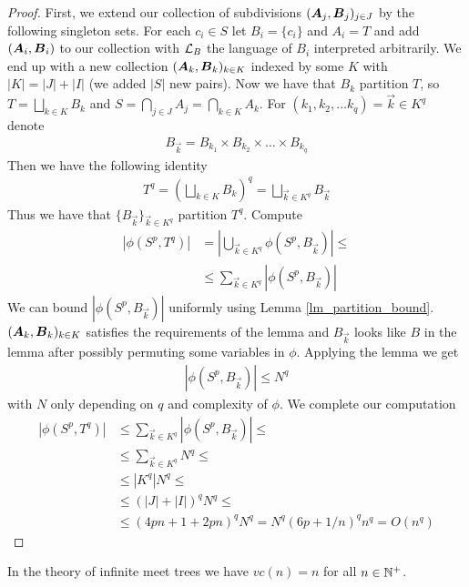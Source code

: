 \documentclass{amsart}
\DeclareMathOperator{\A}{\boldface A}
\DeclareMathOperator{\B}{\boldface B}
\begin{document}
\begin{proof}
	First, we extend our collection of subdivisions $(\A_j, \B_j)_{j \in J}$ by the following singleton sets. For each $c_i \in S$ let $B_i = \{c_i\}$ and $A_i = T$ and add $(\A_i, \B_i)$ to our collection with $\mathcal L_B$ the language of $B_i$ interpreted arbitrarily. We end up with a new collection $(\A_k, \B_k)_{k \in K}$ indexed by some $K$ with $|K| = |J| + |I|$ (we added $|S|$ new pairs). Now we have that $B_k$ partition $T$, so $T = \bigsqcup_{k \in K} B_k$ and $S = \bigcap_{j \in J} A_j = \bigcap_{k \in K} A_k$. For $(k_1, k_2, \ldots k_q) = \vec k \in K^q$ denote 
	\begin{align*}
		B_{\vec k} = B_{k_1} \times B_{k_2} \times \ldots \times B_{k_q}
	\end{align*}
	Then we have the following identity
	\begin{align*}
		T^q = (\bigsqcup_{k \in K} B_k)^q = \bigsqcup_{\vec k \in K^q} B_{\vec k}
	\end{align*}
	Thus we have that $\{B_{\vec k}\}_{\vec k \in K^q}$ partition $T^q$. Compute
	\begin{align*}
		|\phi(S^p, T^q)|
		&= \left|\bigcup_{\vec k \in K^q} \phi(S^p, B_{\vec k}) \right| \leq \\
		&\leq \sum_{\vec k \in K^q} |\phi(S^p, B_{\vec k})|
	\end{align*}
	We can bound $|\phi(S^p, B_{\vec k})|$ uniformly using Lemma \ref{lm_partition_bound}. $(\A_k, \B_k)_{k \in K}$ satisfies the requirements of the lemma and $B_{\vec k}$ looks like $B$ in the lemma after possibly permuting some variables in $\phi$. Applying the lemma we get
	\begin{align*}
		|\phi(S^p, B_{\vec k})| \leq N^q
	\end{align*}
	with $N$ only depending on $q$ and complexity of $\phi$. We complete our computation
	\begin{align*}
		|\phi(S^p, T^q)|
		&\leq \sum_{\vec k \in K^q} |\phi(S^p, B_{\vec k})| \leq \\
		&\leq \sum_{\vec k \in K^q} N^q \leq \\
		&\leq |K^q| N^q \leq \\
		&\leq (|J| + |I|)^q N^q \leq \\
		&\leq (4pn + 1 + 2pn)^q N^q = N^q (6p + 1/n)^q n^q = O(n^q)
	\end{align*}
	\end{proof}
	\begin{Corollary}
		In the theory of infinite meet trees we have $vc(n) = n$ for all $n \in \mathbb{N}^{+}$.
	\end{Corollary}
\end{document}

